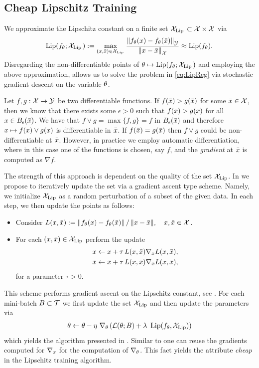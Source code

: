 \subsection{Cheap Lipschitz Training}
We approximate the Lipschitz constant on a finite set $\mathcal{X}_{\operatorname{Lip}{}}\subset\mathcal{X}\times\mathcal{X}$ via
%
\begin{align*}
\operatorname{Lip}(f_\theta; \mathcal{X}_{\operatorname{Lip}{}}) := 
\max_{(x,\bar{x})\in\mathcal{X}_{\operatorname{Lip}{}}} \frac{\left\|f_\theta(x)-f_\theta(\bar{x})\right\|_{\mathcal{\mathcal{Y}}}}{\left\|x-\bar{x}\right\|_{\mathcal{X}}}
\approx
\operatorname{Lip}(f_\theta).
\end{align*}
%
%
Disregarding the non-differentiable points of $\theta\mapsto \operatorname{Lip}(f_\theta; \mathcal{X}_{\operatorname{Lip}{}})$ and employing the above approximation, allows us to solve the problem in \cref{eq:LipReg} via stochastic gradient descent on the variable $\theta$.
%
\begin{remark}{}{}
Let $f,g:\mathcal{X}\to\mathcal{\mathcal{Y}}$ be two differentiable functions. If $f(\bar{x})>g(\bar{x})$ for some $\bar{x}\in\mathcal{X}$, then we know that there exists some $\epsilon>0$ such that $f(x)>g(x)$ for all $x\in B_\epsilon(\bar{x})$. We have that $f\vee g = \max\{f,g\} = f$ in $B_\epsilon(\bar{x})$ and therefore $x\mapsto f(x)\vee g(x)$ is differentiable in $\bar{x}$. If $f(\bar{x})=g(\bar{x})$ then $f\vee g$ could be non-differentiable at $\bar{x}$. However, in practice we employ automatic differentiation, where in this case one of the functions is chosen, say $f$, and the \emph{gradient} at $\bar{x}$ is computed as $\nabla f$. 
\end{remark}
%
%
\noindent%
The strength of this approach is dependent on the quality of the set $\mathcal{X}_{\operatorname{Lip}}$. In \cite{bungert2021clip} we propose to iteratively update the set via a gradient ascent type scheme. Namely, we initialize $\mathcal{X}_{\operatorname{Lip}}$ as a random perturbation of a subset of the given data. In each step, we then update the points as follows:
\begin{itemize}
\item Consider $L(x,\bar{x}) := {\left\|f_\theta(x)-f_\theta(\bar{x})\right\|}\,/\,{\left\|x-\bar{x}\right\|},\quad x,\bar{x}\in\mathcal{X}$.
\item For each $(x,\bar{x})\in\mathcal{X}_{\operatorname{Lip}}$ perform the update 
%
\begin{align*}
x &\gets x + \tau\,L(x,\bar{x}) \nabla_{x} L(x,\bar{x}),\\
\bar{x} &\gets \bar{x} + \tau\,L(x,\bar{x}) \nabla_{\bar{x}} L(x,\bar{x}),
\end{align*}
%
for a parameter $\tau>0$.
\end{itemize}
%
This scheme performs gradient ascent on the Lipschitz constant, see \cite[Alg. 1]{bungert2021clip}. For each mini-batch $B\subset\mathcal{T}$ we first update the set $\mathcal{X}_{\operatorname{Lip}}$ and then update the parameters via
%
\begin{align*}
\theta \gets \theta - \eta\ \nabla_\theta\left(\mathcal{L}(\theta; B) + 
\lambda~\operatorname{Lip}(f_\theta,\mathcal{X}_{\operatorname{Lip}})\right)
\end{align*}
%
which yields the algorithm presented in \cite[Alg. 2]{bungert2021clip}. Similar to \cite{shafahi2019adversarial} one can reuse the gradients computed for $\nabla_x$ for the computation of $\nabla_\theta$. This fact yields the attribute \emph{cheap} in the Lipschitz training algorithm.
%
